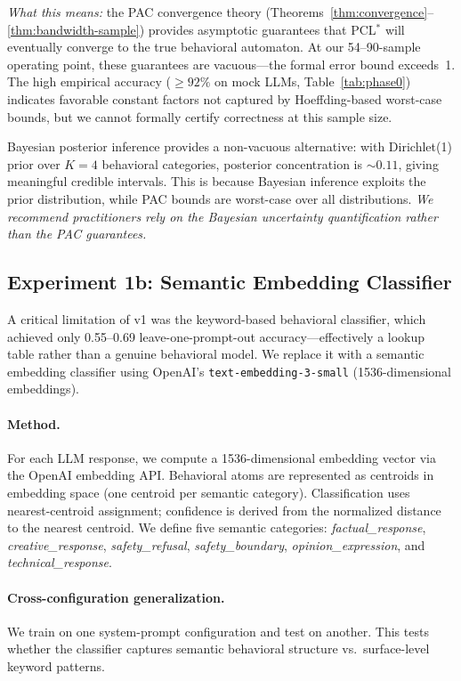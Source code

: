 \documentclass[11pt]{article}
\newcommand{\pclstar}{PCL$^*$}
\begin{document}
\emph{What this means:} the PAC convergence theory
(Theorems~\ref{thm:convergence}--\ref{thm:bandwidth-sample}) provides
asymptotic guarantees that \pclstar{} will eventually converge to the
true behavioral automaton.  At our 54--90-sample operating point,
these guarantees are vacuous---the formal error bound exceeds~1.
The high empirical accuracy (${\ge}92\%$ on mock LLMs,
Table~\ref{tab:phase0}) indicates favorable constant factors
not captured by Hoeffding-based worst-case bounds, but we cannot
formally certify correctness at this sample size.

Bayesian posterior inference provides a non-vacuous alternative:
with Dirichlet(1) prior over $K{=}4$ behavioral categories,
posterior concentration is ${\sim}0.11$, giving meaningful credible
intervals.  This is because Bayesian inference exploits the prior
distribution, while PAC bounds are worst-case over all distributions.
\emph{We recommend practitioners rely on the Bayesian uncertainty
quantification rather than the PAC guarantees.}

\subsection{Experiment 1b: Semantic Embedding Classifier}\label{sec:embedding-classifier}

A critical limitation of v1 was the keyword-based behavioral classifier,
which achieved only 0.55--0.69 leave-one-prompt-out accuracy---effectively
a lookup table rather than a genuine behavioral model. We replace it with
a semantic embedding classifier using OpenAI's \texttt{text-embedding-3-small}
(1536-dimensional embeddings).

\paragraph{Method.}
For each LLM response, we compute a 1536-dimensional embedding vector
via the OpenAI embedding API.  Behavioral atoms are represented as
centroids in embedding space (one centroid per semantic category).
Classification uses nearest-centroid assignment; confidence is derived
from the normalized distance to the nearest centroid.  We define
five semantic categories: \emph{factual\_response},
\emph{creative\_response}, \emph{safety\_refusal},
\emph{safety\_boundary}, \emph{opinion\_expression}, and
\emph{technical\_response}.

\paragraph{Cross-configuration generalization.}
We train on one system-prompt configuration and test on another.
This tests whether the classifier captures semantic behavioral
structure vs.\ surface-level keyword patterns.
\end{document}
